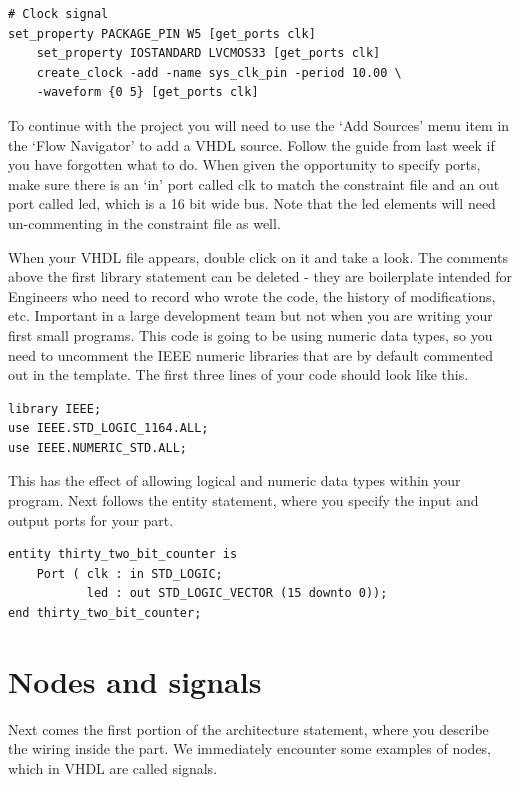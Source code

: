 \documentclass[../physical_computing.tex]{subfiles}
\begin{document}
\begin{verbatim}
# Clock signal
set_property PACKAGE_PIN W5 [get_ports clk]
	set_property IOSTANDARD LVCMOS33 [get_ports clk]
	create_clock -add -name sys_clk_pin -period 10.00 \
	-waveform {0 5} [get_ports clk]
\end{verbatim}

To continue with the project you will need to use the `Add Sources' menu item in the `Flow Navigator' to add a VHDL source. Follow the guide from last week if you have forgotten what to do. When given the opportunity to specify ports, make sure there is an `in' port called clk to match the constraint file and an out port called led, which is a 16 bit wide bus. Note that the led elements will need un-commenting in the constraint file as well.

When your VHDL file appears, double click on it and take a look. The comments above the first library statement can be deleted - they are boilerplate intended for Engineers who need to record who wrote the code, the history of modifications, etc. Important in a large development team but not when you are writing your first small programs. This code is going to be using numeric data types, so you need to uncomment the IEEE numeric libraries that are by default commented out in the template. The first three lines of your code should look like this.

\begin{verbatim}
library IEEE;
use IEEE.STD_LOGIC_1164.ALL;
use IEEE.NUMERIC_STD.ALL;
\end{verbatim}

This has the effect of allowing logical and numeric data types within your program. Next follows the entity statement, where you specify the input and output ports for your part.

\begin{verbatim}
entity thirty_two_bit_counter is
    Port ( clk : in STD_LOGIC;
           led : out STD_LOGIC_VECTOR (15 downto 0));
end thirty_two_bit_counter;
\end{verbatim}

\section{Nodes and signals}
\label{sec:nodesandsignals}

Next comes the first portion of the architecture statement, where you describe the wiring inside the part. We immediately encounter some examples of nodes, which in VHDL are called signals.
\end{document}
